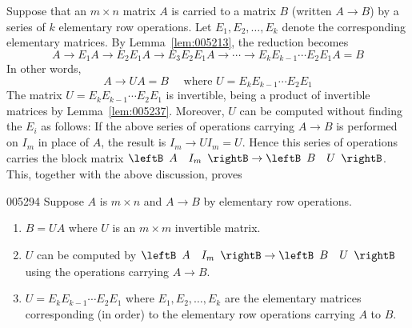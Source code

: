 Suppose that an $m \times n$ matrix $A$ is carried to a matrix $B$ (written $A \to B$) by a series of $k$ elementary row operations. Let $E_{1}, E_{2}, \dots, E_{k}$ denote the corresponding elementary matrices. By Lemma~\ref{lem:005213}, the reduction becomes
\begin{equation*}
A \rightarrow E_{1}A \rightarrow E_{2}E_{1}A \rightarrow E_{3}E_{2}E_{1}A \rightarrow \cdots \rightarrow E_{k}E_{k-1} \cdots E_{2}E_{1}A = B
\end{equation*}
In other words,
\begin{equation*}
A \rightarrow UA = B \quad \mbox{ where } U = E_{k}E_{k-1} \cdots E_{2}E_{1}
\end{equation*}
\noindent The matrix $U = E_{k}E_{k-1} \cdots E_{2}E_{1}$ is invertible, being a product of invertible matrices by Lemma~\ref{lem:005237}. Moreover, $U$ can be computed without finding the $E_{i}$ as follows: If the above series of operations carrying $A \to B$ is performed on $I_{m}$ in place of $A$, the result is $I_{m} \to UI_{m} = U$. Hence this series of operations carries the block matrix $\leftB \begin{array}{cc}
A & I_{m}
\end{array} \rightB \to \leftB \begin{array}{cc}
B & U
\end{array} \rightB$. This, together with the above discussion, proves

\begin{theorem}{}{005294}
Suppose $A$ is $m \times n$ and $A \to B$ by elementary row operations.

\begin{enumerate}
\item $B = UA$ where $U$ is an $m \times m$ invertible matrix.

\item $U$ can be computed by $\leftB \begin{array}{cc}
A & I_{m}
\end{array} \rightB \to \leftB \begin{array}{cc}
B & U
\end{array} \rightB$ using the operations carrying $A \to B$.

\item $U = E_{k}E_{k-1} \cdots E_{2}E_{1}$ where $E_{1}, E_{2}, \dots, E_{k}$ are the elementary matrices corresponding (in order) to the elementary row operations carrying $A$ to $B$.

\end{enumerate}
\end{theorem}

